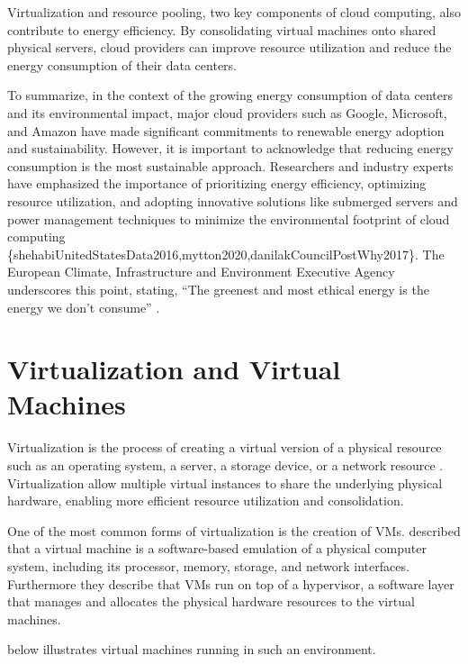 \documentclass[
  table]{report}
\begin{document}
Virtualization and resource pooling, two key components of cloud
computing, also contribute to energy efficiency. By consolidating
virtual machines onto shared physical servers, cloud providers can
improve resource utilization and reduce the energy consumption of their
data centers. \citep{beloglazovEnergyawareResourceAllocation2012}

To summarize, in the context of the growing energy consumption of data
centers and its environmental impact, major cloud providers such as
Google, Microsoft, and Amazon have made significant commitments to
renewable energy adoption and sustainability. However, it is important
to acknowledge that reducing energy consumption is the most sustainable
approach. Researchers and industry experts have emphasized the
importance of prioritizing energy efficiency, optimizing resource
utilization, and adopting innovative solutions like submerged servers
and power management techniques to minimize the environmental footprint
of cloud computing
\{shehabiUnitedStatesData2016,mytton2020,danilakCouncilPostWhy2017\}.
The European Climate, Infrastructure and Environment Executive Agency
underscores this point, stating, ``The greenest and most ethical energy
is the energy we don't consume''
\citep{cappellettiGreenestMostEthical2022}.

\section{Virtualization and Virtual Machines}
\label{sect:virtual}

Virtualization is the process of creating a virtual version of a
physical resource such as an operating system, a server, a storage
device, or a network resource
\citep{chiuehSurveyVirtualizationTechnologies2005}. Virtualization allow
multiple virtual instances to share the underlying physical hardware,
enabling more efficient resource utilization and consolidation.

One of the most common forms of virtualization is the creation of
\ac{VMs}. \citet{barhamXenArtVirtualization2003} described that a
virtual machine is a software-based emulation of a physical computer
system, including its processor, memory, storage, and network
interfaces. Furthermore they describe that \ac{VMs} run on top of a
hypervisor, a software layer that manages and allocates the physical
hardware resources to the virtual machines.

 below illustrates virtual machines running in such an
environment.
\end{document}
